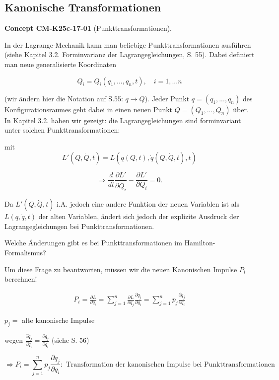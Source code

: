 \documentclass[10pt, letterpaper]{article}
\newcommand{\CustomHeading}[3]{%
  \par\medskip\noindent%
  \textbf{#1 #2} \textnormal{(#3)}.\enskip%
}
\newenvironment{CONC}[2]{\CustomHeading{Concept}{#1}{#2}}{}
\begin{document}
\subsection{Kanonische Transformationen}

\begin{CONC}{CM-K25c-17-01}{Punkttransformationen}
In der Lagrange-Mechanik kann man beliebige Punkttransformationen ausführen (siehe Kapitel 3.2. Forminvarianz der Lagrangegleichungen, S. 55). Dabei definiert man neue generalisierte Koordinaten

\[Q_i = Q_i(q_1,...,q_n,t), \quad i=1,...n\]

(wir ändern hier die Notation auf S.55: $q \rightarrow Q$).
Jeder Punkt $q=(q_1,...,q_n)$ des Konfigurationsraumes geht dabei in einen neuen Punkt $Q=(Q_1,...,Q_n)$ über. In Kapitel 3.2. haben wir gezeigt: die Lagrangegleichungen sind forminvariant unter solchen Punkttransformationen:

mit \[L'(Q,\dot{Q},t) = L(q(Q,t),\dot{q}(Q,\dot{Q},t),t)\]

\[\Rightarrow \frac{d}{dt}\frac{\partial L'}{\partial \dot{Q_i}} - \frac{\partial L'}{\partial Q_i} = 0.\]

Da $L'(Q,\dot{Q},t)$ i.A. jedoch eine andere Funktion der neuen Variablen ist als $L(q,\dot{q},t)$ der alten Variablen, ändert sich jedoch der explizite Ausdruck der Lagrangegleichungen bei Punkttransformationen.

Welche Änderungen gibt es bei Punkttransformationen im Hamilton-Formalismus?

Um diese Frage zu beantworten, müssen wir die neuen Kanonischen Impulse $P_i$ berechnen!


\begin{align*}
P_i = \frac{\partial L}{\partial \dot{q}_i} = \sum_{j=1}^n \frac{\partial L}{\partial \dot{q}_j} \frac{\partial \dot{q}_j}{\partial \dot{q}_i} = \sum_{j=1}^n p_j \frac{\partial \dot{q}_j}{\partial \dot{q}_i}
\end{align*}

$p_j = $ alte kanonische Impulse

wegen $\frac{\partial \dot{q}_j}{\partial \dot{q}_i} = \frac{\partial q_j}{\partial q_i}$ (siehe S. 56)

\begin{equation*}
\Rightarrow P_i = \sum_{j=1}^n p_j \frac{\partial q_j}{\partial q_i} : \text{ Transformation der kanonischen Impulse bei Punkttransformationen}
\end{equation*}


\end{CONC}
\end{document}
